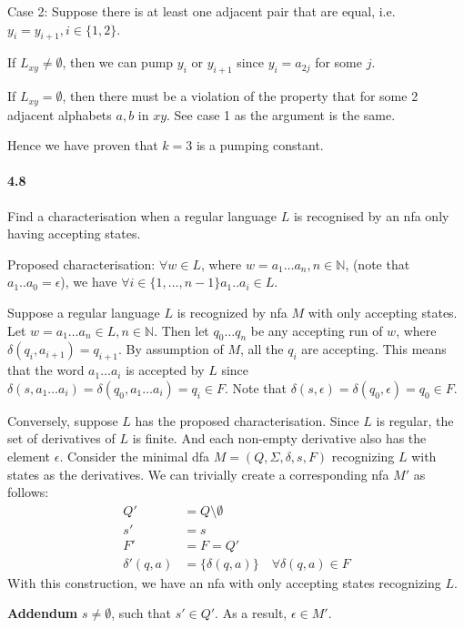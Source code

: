 \documentclass{article}
\begin{document}
Case 2: Suppose there is at least one adjacent pair that are equal, i.e. $y_i=y_{i+1}, i\in \{1,2\}$.

If $L_{xy}\neq \emptyset$, then we can pump $y_i$ or $y_{i+1}$ since $y_i=a_{2j}$ for some $j$.

If $L_{xy}=\emptyset$, then there must be a violation of the property that for some 2 adjacent alphabets $a,b$ in $xy$.
See case 1 as the argument is the same.

Hence we have proven that $k=3$ is a pumping constant.

\paragraph{4.8}\mbox{}

Find a characterisation when a regular language $L$ is recognised by an
nfa only having accepting states.

Proposed characterisation: $\forall w\in L$, where $w=a_1\dots a_n, n\in \mathbb{N}$, (note that $a_1..a_0=\epsilon$), we have $\forall i\in \{1,\dots, n-1\} a_1..a_i\in L$.

Suppose a regular language $L$ is recognized by nfa $M$ with only accepting states. Let $w = a_1\dots a_n\in L, n\in \mathbb{N}$. Then let $q_0\dots q_n$ be any accepting run of $w$, where $\delta(q_i, a_{i+1})=q_{i+1}$. By assumption of $M$, all the $q_i$ are accepting. This means that the word $a_1\dots a_i$ is accepted by $L$ since $\delta(s, a_1\dots a_i) = \delta(q_0, a_1\dots a_i) = q_i\in F$. Note that $\delta(s, \epsilon)=\delta(q_0, \epsilon) = q_0\in F$.

Conversely, suppose $L$ has the proposed characterisation. Since $L$ is regular, the set of derivatives of $L$ is finite. And each non-empty derivative also has the element $\epsilon$. Consider the minimal dfa $M=(Q, \Sigma, \delta, s, F)$ recognizing $L$ with states as the derivatives. We can trivially create a corresponding nfa $M'$ as follows:
\begin{align*}
	Q' &= Q\setminus \emptyset\\
	s' &= s\\
	F' &= F = Q'\\
	\delta'(q, a) &= \{\delta(q, a)\}\quad \forall \delta(q, a)\in F
\end{align*}
With this construction, we have an nfa with only accepting states recognizing $L$.

\textbf{Addendum} $s\neq \emptyset$, such that $s'\in Q'$. As a result, $\epsilon \in M'$.
\end{document}

